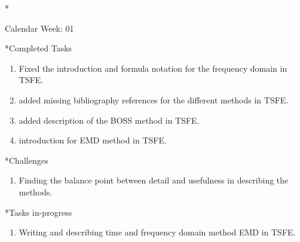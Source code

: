 \documentclass[11pt,a4paper]{article}
\begin{document}
\newpage
\begin{section}*{Calendar Week: 01 \hfill \date{08 January, 2021}}
	
	\begin{subsection}*{Completed Tasks}
		\begin{enumerate}
			\item Fixed the introduction and formula notation for the frequency domain in TSFE.
			\item added missing bibliography references for the different methods in TSFE.
			\item added description of the BOSS method in TSFE.
			\item introduction for EMD method in TSFE.
		\end{enumerate}
	\end{subsection}
	
	\begin{subsection}*{Challenges}
		\begin{enumerate}
			\item Finding the balance point between detail and usefulness in describing the methods.
		\end{enumerate}
	\end{subsection}
	
	\begin{subsection}*{Tasks in-progress}
		\begin{enumerate}
			\item Writing and describing time and frequency domain method EMD in TSFE.
		\end{enumerate}
	\end{subsection}
\end{section}
\end{document}
